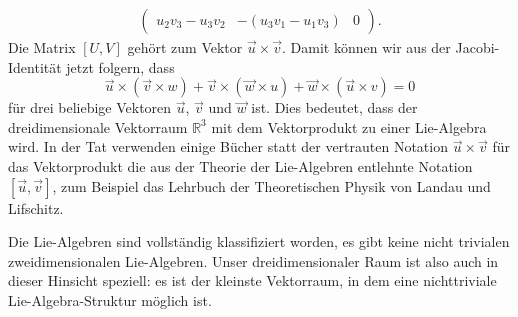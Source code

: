 \begin{beispiel}
\begin{align*}
\begin{pmatrix}
u_2v_3 - u_3v_2         
	&-( u_3v_1 - u_1v_3)
		& 0
\end{pmatrix}.
\end{align*}
Die Matrix $[U,V]$ gehört zum Vektor $\vec u\times\vec v$.
Damit können wir aus der Jacobi-Identität jetzt folgern, dass
\[
\vec u\times(\vec v\times w)
+
\vec v\times(\vec w\times u)
+
\vec w\times(\vec u\times v)
=0
\]
für drei beliebige Vektoren $\vec u$, $\vec v$ und $\vec w$ ist.
Dies bedeutet, dass der dreidimensionale Vektorraum $\mathbb R^3$
mit dem Vektorprodukt zu einer Lie-Algebra wird.
In der Tat verwenden einige Bücher statt der vertrauten Notation
$\vec u\times \vec v$ für das Vektorprodukt die aus der Theorie der
Lie-Algebren entlehnte Notation $[\vec u,\vec v]$, zum Beispiel
das Lehrbuch der Theoretischen Physik \cite{skript:landaulifschitz1}
von Landau und Lifschitz.

Die Lie-Algebren sind vollständig klassifiziert worden, es gibt
keine nicht trivialen zweidimensionalen Lie-Algebren.
Unser dreidimensionaler Raum ist also auch in dieser Hinsicht speziell:
es ist der kleinste Vektorraum, in dem eine nichttriviale Lie-Algebra-Struktur
möglich ist.
\end{beispiel}

